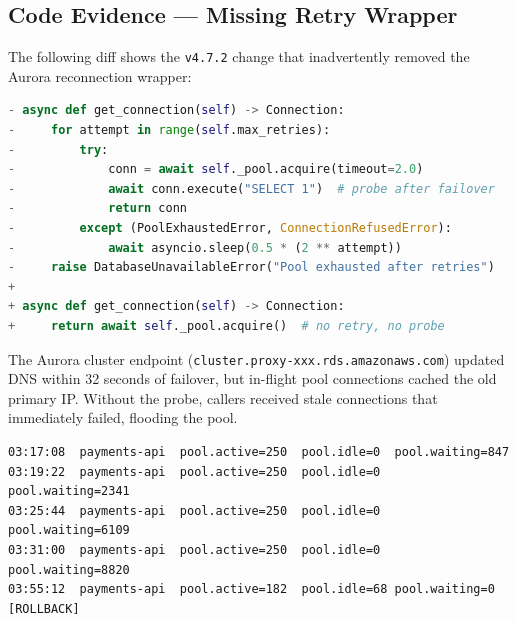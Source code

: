 \subsection{Code Evidence --- Missing Retry Wrapper}

The following diff shows the \texttt{v4.7.2} change that inadvertently removed
the Aurora reconnection wrapper:

\begin{lstlisting}[language=Python, caption={\texttt{src/db/pool.py} --- diff v4.7.1 to v4.7.2}]
- async def get_connection(self) -> Connection:
-     for attempt in range(self.max_retries):
-         try:
-             conn = await self._pool.acquire(timeout=2.0)
-             await conn.execute("SELECT 1")  # probe after failover
-             return conn
-         except (PoolExhaustedError, ConnectionRefusedError):
-             await asyncio.sleep(0.5 * (2 ** attempt))
-     raise DatabaseUnavailableError("Pool exhausted after retries")
+
+ async def get_connection(self) -> Connection:
+     return await self._pool.acquire()  # no retry, no probe
\end{lstlisting}

The Aurora cluster endpoint (\texttt{cluster.proxy-xxx.rds.amazonaws.com})
updated DNS within 32 seconds of failover, but in-flight pool connections
cached the old primary IP. Without the probe, callers received stale
connections that immediately failed, flooding the pool.

\begin{lstlisting}[caption={CloudWatch --- connection pool metric (03:17--03:55 UTC)}]
03:17:08  payments-api  pool.active=250  pool.idle=0  pool.waiting=847
03:19:22  payments-api  pool.active=250  pool.idle=0  pool.waiting=2341
03:25:44  payments-api  pool.active=250  pool.idle=0  pool.waiting=6109
03:31:00  payments-api  pool.active=250  pool.idle=0  pool.waiting=8820
03:55:12  payments-api  pool.active=182  pool.idle=68 pool.waiting=0  [ROLLBACK]
\end{lstlisting}

